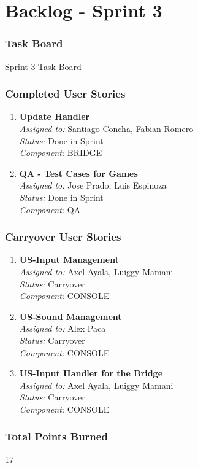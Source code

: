\section{Backlog - Sprint 3}
\author{}
\date{}
\maketitle

\subsubsection*{Task Board}
\href{https://tree.taiga.io/project/joseluis-teran-coffeetime/taskboard/sprint-3}{Sprint 3 Task Board}

\subsubsection*{Completed User Stories}

\begin{enumerate}
    \item \textbf{Update Handler} \\
    \textit{Assigned to:} Santiago Concha, Fabian Romero \\
    \textit{Status:} Done in Sprint \\
    \textit{Component:} BRIDGE
    \item \textbf{QA - Test Cases for Games} \\
    \textit{Assigned to:} Jose Prado, Luis Espinoza \\
    \textit{Status:} Done in Sprint \\
    \textit{Component:} QA
\end{enumerate}

\subsubsection*{Carryover User Stories}

\begin{enumerate}
    \item \textbf{US-Input Management} \\
    \textit{Assigned to:} Axel Ayala, Luiggy Mamani \\
    \textit{Status:} Carryover \\
    \textit{Component:} CONSOLE
    \item \textbf{US-Sound Management} \\
    \textit{Assigned to:} Alex Paca \\
    \textit{Status:} Carryover \\
    \textit{Component:} CONSOLE
    \item \textbf{US-Input Handler for the Bridge} \\
    \textit{Assigned to:} Axel Ayala, Luiggy Mamani \\
    \textit{Status:} Carryover \\
    \textit{Component:} CONSOLE
\end{enumerate}

\subsubsection*{Total Points Burned}
17